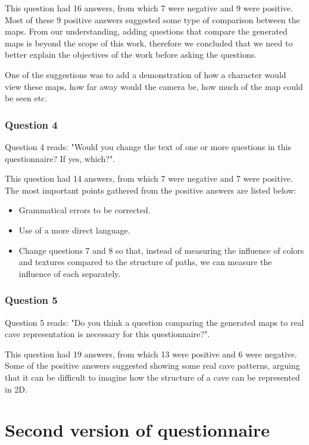 This question had 16 answers, from which 7 were negative and 9 were positive. Most of these 9 positive answers suggested some type of comparison between the maps. From our understanding, adding questions that compare the generated maps is beyond the scope of this work, therefore we concluded that we need to better explain the objectives of the work before asking the questions.

One of the suggestions was to add a demonstration of how a character would view these maps, how far away would the camera be, how much of the map could be seen etc. 

\subsubsection{Question 4}

Question 4 reads: "Would you change the text of one or more questions in this questionnaire? If yes, which?".

This question had 14 answers, from which 7 were negative and 7 were positive. The most important points gathered from the positive answers are listed below:
\begin{itemize}
    \item Grammatical errors to be corrected.
    \item Use of a more direct language.
    \item Change questions 7 and 8 so that, instead of measuring the influence of colors and textures compared to the structure of paths, we can measure the influence of each separately.
\end{itemize}

\subsubsection{Question 5}

Question 5 reads: "Do you think a question comparing the generated maps to real cave representation is necessary for this questionnaire?".

This question had 19 answers, from which 13 were positive and 6 were negative. Some of the positive answers suggested showing some real cave patterns, arguing that it can be difficult to imagine how the structure of a cave can be represented in 2D.

\section{Second version of questionnaire}

